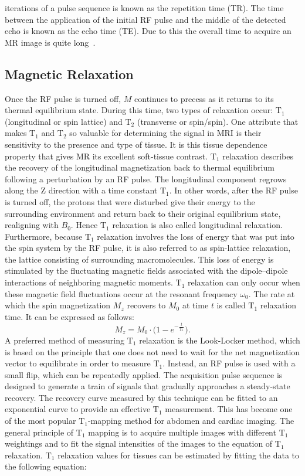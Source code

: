 \documentclass[english,version-2022-01]{uzl-thesis} %
\begin{document}
iterations of a pulse sequence is known as the repetition time (TR). The time between the application of the initial RF pulse and the middle of the detected echo is known as the echo time (TE). Due to this the overall time to acquire an MR image is quite long~\cite{Serai2021}.\\

\subsection{Magnetic Relaxation}
Once the RF pulse is turned off, $M$ continues to precess as it returns to its thermal equilibrium state. During this time, two types of relaxation occur: $\text{T}_1$ (longitudinal or spin lattice) and $\text{T}_2$ (transverse or spin/spin). One attribute that makes $\text{T}_1$ and $\text{T}_2$ so valuable for determining the signal in MRI is their sensitivity to the presence and type of tissue. It is this tissue dependence property that gives MR its excellent soft-tissue contrast. $\text{T}_1$ relaxation describes the recovery of the longitudinal magnetization back to thermal equilibrium following a perturbation by an RF pulse. The longitudinal component regrows along the Z direction with a time constant $\text{T}_1$. In other words, after the RF pulse is turned off, the protons that were disturbed give their energy to the surrounding environment and return back to their original equilibrium state, realigning with $B_0$. Hence $\text{T}_1$ relaxation is also called longitudinal relaxation. Furthermore, because $\text{T}_1$ relaxation involves the loss of energy that was put into the spin system by the RF pulse, it is also referred to as spin-lattice relaxation, the lattice consisting of surrounding macromolecules. This loss of energy is stimulated by the fluctuating magnetic fields associated with the dipole–dipole interactions of neighboring magnetic moments. $\text{T}_1$ relaxation can only occur when these magnetic field fluctuations occur at the resonant frequency $\omega_0$. The rate at which the spin magnetization $M_z$ recovers to $M_0$ at time $t$ is called $\text{T}_1$ relaxation time. It can be expressed as follows:
\begin{equation}
	M_z = M_0 \cdot \bigg(1 - e^{-\frac{t}{\text{T}_1}} \bigg).
\end{equation}
A preferred method of measuring $\text{T}_1$ relaxation is the Look-Locker method, which is based on the principle that one does not need to wait for the net magnetization vector to equilibrate in order to measure $\text{T}_1$. Instead, an RF pulse is used with a small flip, which can be repeatedly applied. The acquisition pulse sequence is designed to generate a train of signals that gradually approaches a steady-state recovery. The recovery curve measured by this technique can be fitted to an exponential curve to provide an effective $\text{T}_1$ measurement. This has become one of the most popular $\text{T}_1$-mapping method for abdomen and cardiac imaging. The general principle of $\text{T}_1$ mapping is to acquire multiple images with different $\text{T}_1$ weightings and to fit the signal intensities of the images to the equation of $\text{T}_1$ relaxation. $\text{T}_1$ relaxation values for tissues can be estimated by fitting the data to the following equation:
\end{document}

